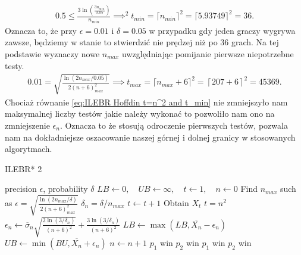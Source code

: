 \documentclass[inzynierska]{pwr_wmat_praca_dyplomowa}
\theoremstyle{plain}
\numberwithin{theorem}{chapter}
\theoremstyle{definition}
\numberwithin{theorem}{chapter}
\begin{document}
	\begin{gather*}
		\label{eq:ILEBR Bernstein t=n^2}
		0.5 \le \frac{3  \ln(\frac{3n_{min}}{0.05})}{n_{min}}\implies^2 t_{min} = \lceil n_{min} \rceil^2 = \lceil5.93749\rceil^2= 36. 
	\end{gather*}
	Oznacza to, że przy $\epsilon=0.01$ i $\delta= 0.05$ w przypadku gdy jeden graczy wygrywa zawsze, będziemy w stanie to stwierdzić nie prędzej niż po 36 grach.
	Na tej podstawie wyznaczy nowe $n_{max}$ uwzględniając pomijanie pierwsze niepotrzebne testy.
	\begin{gather}
		\label{eq:ILEBR Hoffdin t=n^2 and t_min}
		0.01 =  \sqrt{\frac{\ln(2n_{max}/0.05)}{2(n+6)_{max}^2}} \implies t_{max} = \lceil n_{max}+6\rceil^2 = \left\lceil 207+6\right\rceil^2= 45369.
	\end{gather}
	Chociaż równanie \ref{eq:ILEBR Hoffdin t=n^2 and t_min} nie zmniejszyło nam maksymalnej liczby testów jakie należy wykonać to pozwoliło nam ono na zmniejszenie $\epsilon_n$. Oznacza to że stosują odroczenie pierwszych testów, pozwala nam na dokładniejsze oszacowanie naszej górnej i dolnej granicy w stosowanych algorytmach.
	\begin{algorithm}[H]\captionsetup{labelformat=custom2}
		\caption{ILEBR* 2}\label{alg:IEBLR* 2}
		\begin{algorithmic}
			\Ensure precision $\epsilon$, probability $\delta$ 
			\State  $ LB \gets 0,\quad UB \gets \infty,\quad t \gets 1,\quad n \gets 0 $
			\State Find $n_{max}$ such as $		\epsilon =  \sqrt{\frac{\ln(2n_{max}/\delta)}{2(n+6)_{max}^2}} $
			\Statex $\delta_n = \delta/n_{max}$
			\Repeat 
			\State $t \gets t + 1$
			\State Obtain $X_t$
			\Until $t=n^2$
			\State $\epsilon_n \gets \overline{\sigma}_n \sqrt{\frac{2\ln(3/\delta_n)}{(n+6)^2}} + \frac{3  \ln{(3 / \delta_n)}}{(n+6)^2}$ 
			\State $LB \gets \max(LB,  \overline{X_n} - \epsilon_n)$
			\State $UB \gets \min(BU,  \overline{X_n} + \epsilon_n)$
			\State $n \gets n + 1$
			\EndWhile
			\State \Return $p_1$ win
			\State \Return $p_2$ win
			\State \Return $p_1$ win
			\Else
			\State \Return $p_2$ win
			\EndIf
		\end{algorithmic}
	\end{algorithm}
	\newpage
\end{document}
